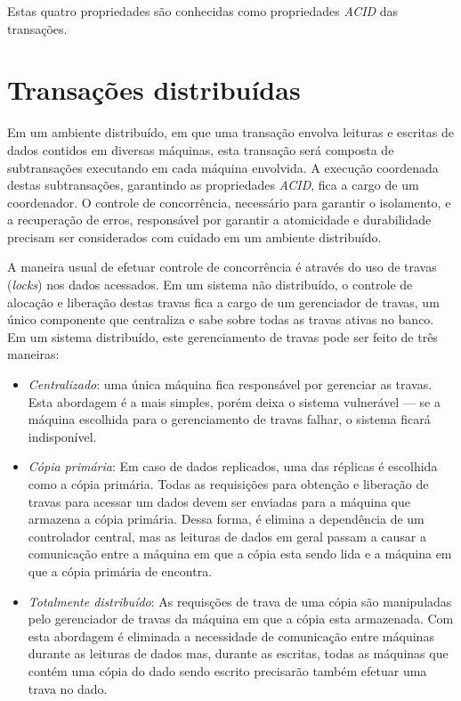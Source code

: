 \documentclass[11pt,twoside,a4paper]{book}
\begin{document}
Estas quatro propriedades são conhecidas como propriedades \emph{ACID} das transações.

\section{Transações distribuídas}
\label{sec:transacoes_distribuidas}
Em um ambiente distribuído, em que uma transação envolva leituras e escritas de dados contidos em diversas máquinas, esta transação será composta de subtransações executando em cada máquina envolvida. A execução coordenada destas subtransações, garantindo as propriedades \emph{ACID}, fica a cargo de um coordenador. O controle de concorrência, necessário para garantir o isolamento, e a recuperação de erros, responsável por garantir a atomicidade e durabilidade precisam ser considerados com cuidado em um ambiente distribuído.

A maneira usual de efetuar controle de concorrência é através do uso de travas (\emph{locks}) nos dados acessados. Em um sistema não distribuído, o controle de alocação e liberação destas travas fica a cargo de um gerenciador de travas, um único componente que centraliza e sabe sobre todas as travas ativas no banco. Em um sistema distribuído, este gerenciamento de travas pode ser feito de três maneiras:
\begin{itemize}
\item \emph{Centralizado}: uma única máquina fica responsável por gerenciar as travas. Esta abordagem é a mais simples, porém deixa o sistema vulnerável --- se a máquina escolhida para o gerenciamento de travas falhar, o sistema ficará indisponível.
\item \emph{Cópia primária}: Em caso de dados replicados, uma das réplicas é escolhida como a cópia primária. Todas as requisições para obtenção e liberação de travas para acessar um dados devem ser enviadas para a máquina que armazena a cópia primária. Dessa forma, é elimina a dependência de um controlador central, mas as leituras de dados em geral passam a causar a comunicação entre a máquina em que a cópia esta sendo lida e a máquina em que a cópia primária de encontra.
\item \emph{Totalmente distribuído}: As requisções de trava de uma cópia são manipuladas pelo gerenciador de travas da máquina em que a cópia esta armazenada. Com esta abordagem é eliminada a necessidade de comunicação entre máquinas durante as leituras de dados mas, durante as escritas, todas as máquinas que contém uma cópia do dado sendo escrito precisarão também efetuar uma trava no dado.
\end{itemize}
\end{document}
